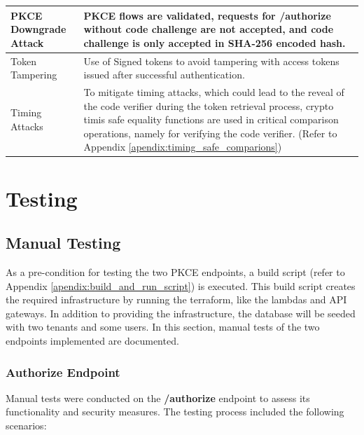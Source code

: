 \begin{longtable}{|p{5cm}|p{10cm}|}
\hline
PKCE Downgrade Attack & PKCE flows are validated, requests for \textbf{/authorize} without code challenge are not accepted, and code challenge is only accepted in SHA-256 encoded hash. \\
\hline
Token Tampering & Use of Signed tokens to avoid tampering with access tokens issued after successful authentication.  \\
\hline
Timing Attacks & To mitigate timing attacks, which could lead to the reveal of the code verifier during the token retrieval process, crypto timis safe equality functions are used in critical comparison operations, namely for verifying the code verifier. (Refer to Appendix \ref{apendix:timing_safe_comparions})  \\
\hline
\end{longtable}

\section{Testing}

\subsection{Manual Testing}
As a pre-condition for testing the two PKCE endpoints, a build script (refer to Appendix \ref{apendix:build_and_run_script}) is executed. This build script creates the required infrastructure by running the terraform, like the lambdas and API gateways. In addition to providing the infrastructure, the database will be seeded with two tenants and some users. In this section, manual tests of the two endpoints implemented are documented.


\subsubsection{Authorize Endpoint}
Manual tests were conducted on the \textbf{/authorize} endpoint to assess its functionality and security measures. The testing process included the following scenarios:

